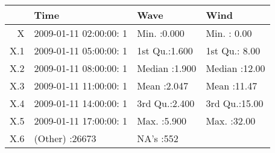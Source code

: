 \begin{table}[ht]
\centering
\begin{tabular}{rlll}
  \hline
 &                  Time &      Wave &      Wind \\ 
  \hline
X & 2009-01-11 02:00:00:    1   & Min.   :0.000   & Min.   : 0.00   \\ 
  X.1 & 2009-01-11 05:00:00:    1   & 1st Qu.:1.600   & 1st Qu.: 8.00   \\ 
  X.2 & 2009-01-11 08:00:00:    1   & Median :1.900   & Median :12.00   \\ 
  X.3 & 2009-01-11 11:00:00:    1   & Mean   :2.047   & Mean   :11.47   \\ 
  X.4 & 2009-01-11 14:00:00:    1   & 3rd Qu.:2.400   & 3rd Qu.:15.00   \\ 
  X.5 & 2009-01-11 17:00:00:    1   & Max.   :5.900   & Max.   :32.00   \\ 
  X.6 & (Other)            :26673   & NA's   :552   &  \\ 
   \hline
\end{tabular}
\end{table}

